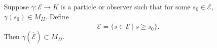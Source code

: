 Suppose $\gamma: \mathcal{E} \to K$ is a particle or observer such that for some $s_0 \in \mathcal{E}$, $\gamma(s_0) \in M_{II}$. Define
$$\hat{\mathcal{E}} = \{s \in \mathcal{E} \mid s \geq s_0\}.$$
Then $\gamma(\hat{\mathcal{E}}) \subset M_{II}$.
